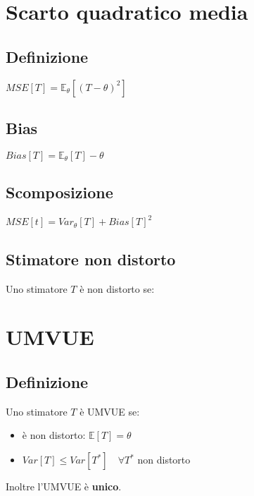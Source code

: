 \documentclass[a4paper,notitlepage]{report}%
\newcommand{\E}{\mathbb{E}} %
\begin{document}
\begin{multicols*}{2}
\section*{Scarto quadratico media}


    \subsection*{Definizione}
    $MSE[T] = \E_\theta[(T-\theta)^2]$


    \subsection*{Bias}
    $Bias[T] = \E_\theta[T]-\theta$

    
    \subsection*{Scomposizione}
    $MSE[t] = Var_\theta[T] + Bias[T]^2$


    \subsection*{Stimatore non distorto}
    Uno stimatore $T$ è non distorto se:


\section*{UMVUE}

    \subsection*{Definizione}
    Uno stimatore $T$ è UMVUE se:
    \begin{itemize}
        \item è non distorto: $\E[T]=\theta$
        \item $Var[T] \leq Var[T^*] \quad \forall T^*$ non distorto
    \end{itemize}
    Inoltre l'UMVUE è \textbf{unico}.



\end{multicols*}
\end{document}
